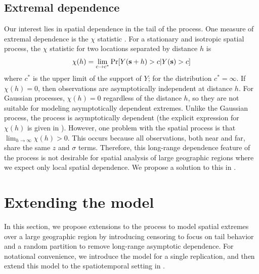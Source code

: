 \subsection{Extremal dependence}\label{sts:extdep}
Our interest lies in spatial dependence in the tail of the \skewt process.
One measure of extremal dependence is the $\chi$ statistic \citep{Coles1999}.
For a stationary and isotropic spatial process, the $\chi$ statistic for two locations separated by distance $h$ is
\begin{align} \label{steq:chih}
  \chi(h) = \lim_{c \rightarrow c^*} \Pr[Y(\mathbf{s} + h) > c | Y(\mathbf{s}) > c]
\end{align}
where $c^*$ is the upper limit of the support of $Y$; for the \skewt distribution $c^* = \infty$.
If $\chi(h) = 0$, then observations are asymptotically independent at distance $h$.
For Gaussian processes, $\chi(h) = 0$ regardless of the distance $h$, so they are not suitable for modeling asymptotically dependent extremes.
Unlike the Gaussian process, the \skewt process is asymptotically dependent (the explicit expression for $\chi(h)$ is given in ).
However, one problem with the spatial \skewt process is that $\lim_{h \rightarrow \infty} \chi(h) > 0$.
This occurs because all observations, both near and far, share the same $z$ and $\sigma$ terms.
Therefore, this long-range dependence feature of the \skewt process is not desirable for spatial analysis of large geographic regions where we expect only local spatial dependence.
We propose a solution to this in .

\section{Extending the model}\label{sts:spatial}
In this section, we propose extensions to the \skewt process to model spatial extremes over a large geographic region by introducing censoring to focus on tail behavior and a random partition to remove long-range asymptotic dependence.
For notational convenience, we introduce the model for a single replication, and then extend this model to the spatiotemporal setting in .

